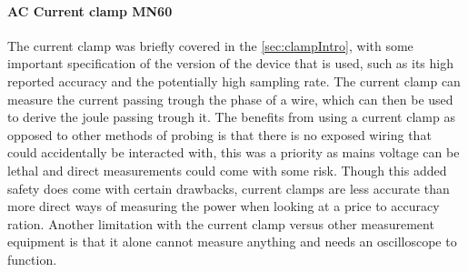 \paragraph*{AC Current clamp MN60}
The current clamp was briefly covered in the \cref{sec:clampIntro}, with some important specification of the version of the device that is used, such as its high reported accuracy and the potentially high sampling rate. 
The current clamp can measure the current passing trough the phase of a wire, which can then be used to derive the joule passing trough it. The benefits from using a current clamp as opposed to other methods of probing is that there is no exposed wiring that could accidentally be interacted with, this was a priority as mains voltage can be lethal and direct measurements could come with some risk. Though this added safety does come with certain drawbacks, current clamps are less accurate than more direct ways of measuring the power when looking at a price to accuracy ration. Another limitation with the current clamp versus other measurement equipment is that it alone cannot measure anything and needs an oscilloscope to function.